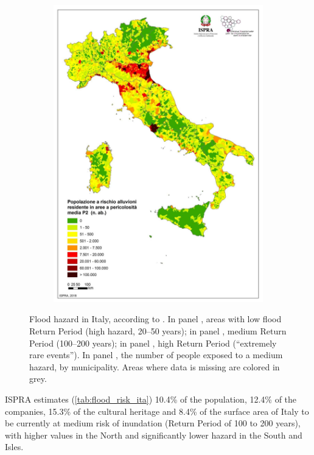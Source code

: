 \begin{figure}
\begin{subfigure}{.475\textwidth}
        \includegraphics[width=\textwidth]{figures/ita_flood/pop_p2}
    \end{subfigure}
    \decoRule
    \caption[Flood hazard in Italy according to ISPRA]{
    Flood hazard in Italy, according to \citet[][figures 2.1 to 2.3 and 4.25]{ISPRA2018}. In panel , areas with low flood Return Period (high hazard, 20--50 years); in panel , medium Return Period (100--200 years); in panel , high Return Period (``extremely rare events''). In panel , the number of people exposed to a medium hazard, by municipality. Areas where data is missing are colored in grey.
} \label{fig:ispra_ita_flood}
\end{figure}
ISPRA estimates (\cref{tab:flood_risk_ita}) 10.4\% of the population, 12.4\% of the companies, 15.3\% of the cultural heritage and 8.4\% of the surface area of Italy to be currently at medium risk of inundation (Return Period of 100 to 200 years), with higher values in the North and significantly lower hazard in the South and Isles.

